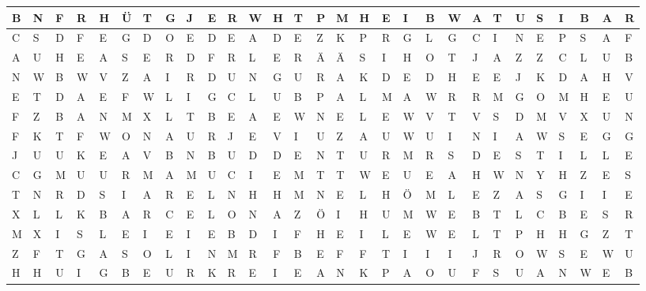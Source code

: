 \begin{center}
	\footnotesize
	\setlength{\tabcolsep}{0.3em}
	\begin{tabular}{| *{29}{>{\centering\arraybackslash}m{1.1em} |}}
		\hline
		B & N & F & R & H & Ü & T & G & J & E & R & W & H & T & P & M & H & E
			& I & B & W & A & T & U & S & I & B & A & R
		\\ \hline
		C & S & D & F & E & G & D & O & E & D & E & A & D & E & Z & K & P & R
			& G & L & G & C & I & N & E & P & S & A & F
		\\ \hline
		A & U & H & E & A & S & E & R & D & F & R & L & E & R & Ä & Ä & S & I
			& H & O & T & J & A & Z & Z & C & L & U & B
		\\ \hline
		N & W & B & W & V & Z & A & I & R & D & U & N & G & U & R & A & K & D
			& E & D & H & E & E & J & K & D & A & H & V
		\\ \hline
		E & T & D & A & E & F & W & L & I & G & C & L & U & B & P & A & L & M
			& A & W & R & R & M & G & O & M & H & E & U
		\\ \hline
		F & Z & B & A & N & M & X & L & T & B & E & A & E & W & N & E & L & E
			& W & V & T & V & S & D & M & V & X & U & N
		\\ \hline
		F & K & T & F & W & O & N & A & U & R & J & E & V & I & U & Z & A & U
			& W & U & I & N & I & A & W & S & E & G & G
		\\ \hline
		J & U & U & K & E & A & V & B & N & B & U & D & D & E & N & T & U & R
			& M & R & S & D & E & S & T & I & L & L & E
		\\ \hline
		C & G & M & U & U & R & M & A & M & U & C & I & E & M & T & T & W & E
			& U & E & A & H & W & N & Y & H & Z & E & S
		\\ \hline
		T & N & R & D & S & I & A & R & E & L & N & H & H & M & N & E & L & H
			& Ö & M & L & E & Z & A & S & G & I & I & E
		\\ \hline
		X & L & L & K & B & A & R & C & E & L & O & N & A & Z & Ö & I & H & U
			& M & W & E & B & T & L & C & B & E & S & R
		\\ \hline
		M & X & I & S & L & E & I & E & I & E & B & D & I & F & H & E & I & L
			& E & W & E & L & T & P & H & H & G & Z & T
		\\ \hline
		Z & F & T & G & A & S & O & L & I & N & M & R & F & B & E & F & F & T
			& I & I & I & J & R & O & W & S & E & W & U
		\\ \hline
		H & H & U & I & G & B & E & U & R & K & R & E & I & E & A & N & K & P
			& A & O & U & F & S & U & A & N & W & E & B

\end{tabular}
\end{center}
